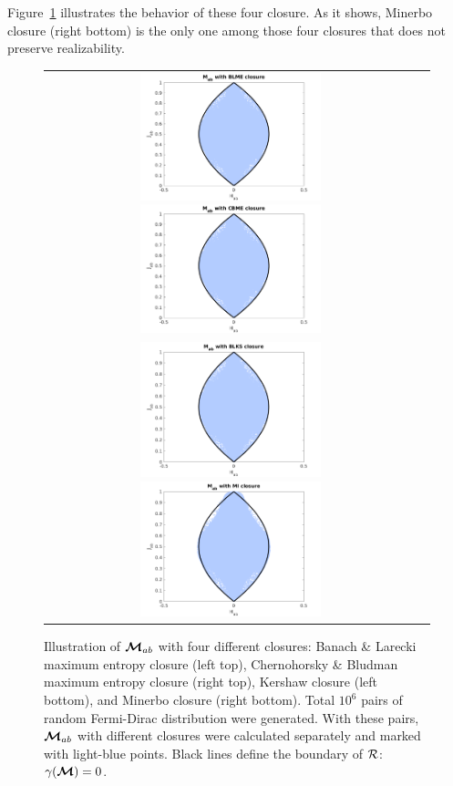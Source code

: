 Figure~\ref{fig:MabWithDifferentClosure} illustrates the behavior of these four closure.
As it shows, Minerbo closure (right bottom) is the only one among those four closures that does not preserve realizability.
\begin{figure}[h]
  \centering
  \begin{tabular}{cc}
    \includegraphics[width=0.5\textwidth]{figures/MabWithBLME}
    \includegraphics[width=0.5\textwidth]{figures/MabWithCBME} \\
    \includegraphics[width=0.5\textwidth]{figures/MabWithBLKS}
    \includegraphics[width=0.5\textwidth]{figures/MabWithMI}
  \end{tabular}
   \caption{Illustration of $\boldsymbol{\mathcal{M}}_{ab}$ with four different closures: Banach \& Larecki maximum entropy closure (left top), Chernohorsky \& Bludman maximum entropy closure (right top), Kershaw closure (left bottom), and Minerbo closure (right bottom).
   Total $10^{6}$ pairs of random Fermi-Dirac distribution were generated.
   With these pairs, $\boldsymbol{\mathcal{M}}_{ab}$ with different closures were calculated separately and marked with light-blue points.
   Black lines define the boundary of $\mathcal{R}$: $\gamma(\boldsymbol{\mathcal{M}}) = 0$.}
  \label{fig:MabWithDifferentClosure}
\end{figure}